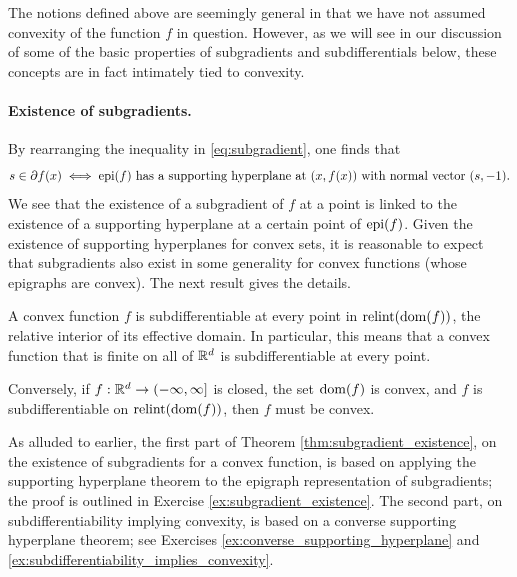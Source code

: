 The notions defined above are seemingly general in that we have not assumed 
convexity of the function $f$ in question. However, as we will see in our 
discussion of some of the basic properties of subgradients and subdifferentials
below, these concepts are in fact intimately tied to convexity.   

\paragraph{Existence of subgradients.}

By rearranging the inequality in \eqref{eq:subgradient}, one finds that 
\[
s \in \partial f(x) \iff \text{$\operatorname{epi}(f)$ has a supporting hyperplane at
  $(x, f(x))$ with normal vector $(s, -1)$.}
\]
We see that the existence of a subgradient of $f$ at a point is linked to the
existence of a supporting hyperplane at a certain point of $\operatorname{epi}(f)$. Given the
existence of supporting hyperplanes for convex sets, it is reasonable to expect
that subgradients also exist in some generality for convex functions (whose
epigraphs are convex). The next result gives the details.

\begin{Theorem}
\label{thm:subgradient_existence}
A convex function $f$ is subdifferentiable at every point in $\operatorname{relint}(\operatorname{dom}(f))$,
the relative interior of its effective domain. In particular, this means that a
convex function that is finite on all of $\mathbb{R}^d$ is subdifferentiable at every
point.   

\setlength{\parindent}{\normalparindent}
Conversely, if $f : \mathbb{R}^d \to (-\infty, \infty]$ is closed, the set $\operatorname{dom}(f)$ is
convex, and $f$ is subdifferentiable on $\operatorname{relint}(\operatorname{dom}(f))$, then $f$ must be
convex.          
\end{Theorem}

As alluded to earlier, the first part of Theorem
\ref{thm:subgradient_existence}, on the existence of subgradients for a convex
function, is based on applying the supporting hyperplane theorem to the epigraph
representation of subgradients; the proof is outlined in Exercise
\ref{ex:subgradient_existence}. The second part, on subdifferentiability
implying convexity, is based on a converse supporting hyperplane theorem; see
Exercises \ref{ex:converse_supporting_hyperplane} and
\ref{ex:subdifferentiability_implies_convexity}. 



